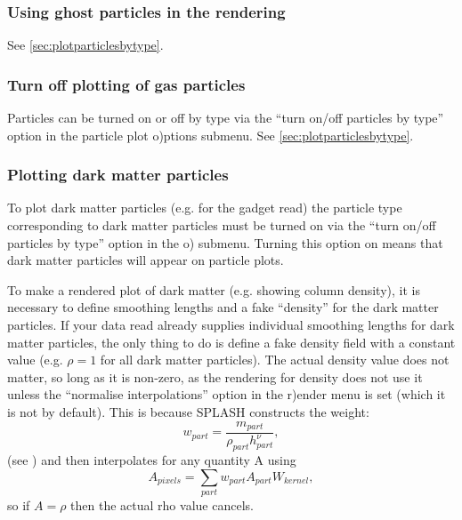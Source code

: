 \documentclass[a4paper,10pt]{article}
\begin{document}
\subsubsection{ Using ghost particles in the rendering}
 See \ref{sec:plotparticlesbytype}.

\subsubsection{ Turn off plotting of gas particles}
 Particles can be turned on or off by type via the ``turn on/off particles by type'' option in the particle plot o)ptions submenu. See \ref{sec:plotparticlesbytype}. 

\subsubsection{ Plotting dark matter particles}
\label{sec:darkmatter}
 To plot dark matter particles (e.g. for the gadget read) the particle type corresponding to dark matter particles must be turned on via the ``turn on/off particles by type'' option in the o) submenu. Turning this option on means that dark matter particles will appear on particle plots.
 
  To make a rendered plot of dark matter (e.g. showing column density), it is necessary to define smoothing lengths and a fake ``density'' for the dark matter particles. If your data read already supplies individual smoothing lengths for dark matter particles, the only thing to do is define a fake density field with a constant value (e.g. $\rho = 1$ for all dark matter particles). The actual density value does not matter, so long as it is non-zero, as the rendering for density does not use it unless the ``normalise interpolations'' option in the r)ender menu is set (which it is not by default). This is because SPLASH constructs the weight:
\begin{equation}
w_{part} = \frac{m_{part}}{\rho_{part} h_{part}^{\nu}},
\end{equation}
(see \citealt{splashpaper}) and then interpolates for any quantity A using
\begin{equation}
A_{pixels} = \sum_{part} w_{part} A_{part} W_{kernel},
\end{equation}
so if $A = \rho$ then the actual rho value cancels. 
 
\end{document}
